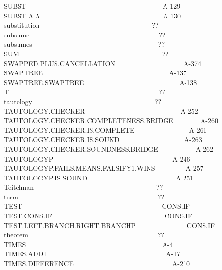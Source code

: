 \documentclass[11pt]{book}
\newenvironment{pubasis}{\begin{flushleft}\ttfamily\small}{\normalsize\rmfamily\end{flushleft}}
\begin{document}
\begin{pubasis}
SUBST~~~~~~~~~~~~~~~~~~~~~~~~~~~~~~~~~~~~~~~~A-129\\
SUBST.A.A~~~~~~~~~~~~~~~~~~~~~~~~~~~~~~~~~~~~A-130\\
substitution~~~~~~~~~~~~~~~~~~~~~~~~~~~~~~~~~??\\
subsume~~~~~~~~~~~~~~~~~~~~~~~~~~~~~~~~~~~~~~??\\
subsumes~~~~~~~~~~~~~~~~~~~~~~~~~~~~~~~~~~~~~??\\
SUM~~~~~~~~~~~~~~~~~~~~~~~~~~~~~~~~~~~~~~~~~~??\\
SWAPPED.PLUS.CAN\-CELLATION~~~~~~~~~~~~~~~~~~~~A-374\\
SWAPTREE~~~~~~~~~~~~~~~~~~~~~~~~~~~~~~~~~~~~~A-137\\
SWAPTREE.SWAPTREE~~~~~~~~~~~~~~~~~~~~~~~~~~~~A-138\\
T~~~~~~~~~~~~~~~~~~~~~~~~~~~~~~~~~~~~~~~~~~~~??\\
tautology~~~~~~~~~~~~~~~~~~~~~~~~~~~~~~~~~~~~??\\
TAU\-TOL\-OGY.CHECK\-ER~~~~~~~~~~~~~~~~~~~~~~~~~~~~A-252\\
TAU\-TOL\-OGY.CHECK\-ER.COMPLETENESS.BRIDGE~~~~~~~~A-260\\
TAU\-TOL\-OGY.CHECK\-ER.IS.COMPLETE~~~~~~~~~~~~~~~~A-261\\
TAU\-TOL\-OGY.CHECK\-ER.IS.SOUND~~~~~~~~~~~~~~~~~~~A-263\\
TAU\-TOL\-OGY.CHECK\-ER.SOUNDNESS.BRIDGE~~~~~~~~~~~A-262\\
TAUTOLOGYP~~~~~~~~~~~~~~~~~~~~~~~~~~~~~~~~~~~A-246\\
TAU\-TOL\-OGYP.FAILS.MEANS.FAL\-SI\-FY1.WINS~~~~~~~~~A-257\\
TAU\-TOL\-OGYP.IS.SOUND~~~~~~~~~~~~~~~~~~~~~~~~~~A-251\\
Teitelman~~~~~~~~~~~~~~~~~~~~~~~~~~~~~~~~~~~~??\\
term~~~~~~~~~~~~~~~~~~~~~~~~~~~~~~~~~~~~~~~~~??\\
TEST~~~~~~~~~~~~~~~~~~~~~~~~~~~~~~~~~~~~~~~~~CONS.IF\\
TEST.CONS.IF~~~~~~~~~~~~~~~~~~~~~~~~~~~~~~~~~CONS.IF\\
TEST.LEFT.BRANCH.RIGHT.BRANCHP~~~~~~~~~~~~~~~CONS.IF\\
theorem~~~~~~~~~~~~~~~~~~~~~~~~~~~~~~~~~~~~~~??\\
TIMES~~~~~~~~~~~~~~~~~~~~~~~~~~~~~~~~~~~~~~~~A-4\\
TIMES.ADD1~~~~~~~~~~~~~~~~~~~~~~~~~~~~~~~~~~~A-17\\
TIMES.DIF\-FER\-ENCE~~~~~~~~~~~~~~~~~~~~~~~~~~~~~A-210\\

\end{pubasis}
\end{document}
